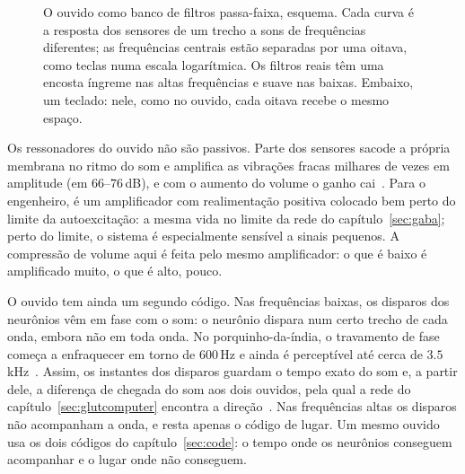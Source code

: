 \begin{figure}[t]
\centering
{}
\caption{O ouvido como banco de filtros passa-faixa, esquema. Cada curva é a resposta dos sensores de um trecho a sons de frequências diferentes; as frequências centrais estão separadas por uma oitava, como teclas numa escala logarítmica. Os filtros reais têm uma encosta íngreme nas altas frequências e suave nas baixas. Embaixo, um teclado: nele, como no ouvido, cada oitava recebe o mesmo espaço.}
\label{fig:filterbank}
\end{figure}

Os ressonadores do ouvido não são passivos. Parte dos sensores sacode a própria membrana no ritmo do som e amplifica as vibrações fracas milhares de vezes em amplitude (em $66$--$76$\,dB), e com o aumento do volume o ganho cai~\cite{Ruggero1997,Robles2001}. Para o engenheiro, é um amplificador com realimentação positiva colocado bem perto do limite da autoexcitação: a mesma vida no limite da rede do capítulo~\ref{sec:gaba}; perto do limite, o sistema é especialmente sensível a sinais pequenos. A compressão de volume aqui é feita pelo mesmo amplificador: o que é baixo é amplificado muito, o que é alto, pouco.

O ouvido tem ainda um segundo código. Nas frequências baixas, os disparos dos neurônios vêm em fase com o som: o neurônio dispara num certo trecho de cada onda, embora não em toda onda. No porquinho-da-índia, o travamento de fase começa a enfraquecer em torno de $600$\,Hz e ainda é perceptível até cerca de $3.5$\,kHz~\cite{PalmerRussell1986}. Assim, os instantes dos disparos guardam o tempo exato do som e, a partir dele, a diferença de chegada do som aos dois ouvidos, pela qual a rede do capítulo~\ref{sec:glutcomputer} encontra a direção~\cite{Grothe2010}. Nas frequências altas os disparos não acompanham a onda, e resta apenas o código de lugar. Um mesmo ouvido usa os dois códigos do capítulo~\ref{sec:code}: o tempo onde os neurônios conseguem acompanhar e o lugar onde não conseguem.

